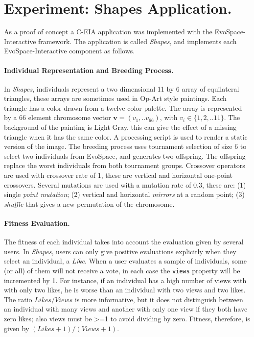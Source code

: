 \documentclass{llncs}
\begin{document}
\section{Experiment: Shapes Application.}
\label{sec:experiments}
As a proof of concept a C-EIA application was implemented with the EvoSpace-Interactive framework.
The application is called \emph{Shapes}, and implements each EvoSpace-Interactive component as follows.

\paragraph{Individual Representation and Breeding Process.}
In \emph{Shapes}, individuals represent a two dimensional 11 by 6 array of equilateral triangles, these arrays are sometimes used in Op-Art style paintings.
Each triangle has a color drawn from a twelve color palette.
The array is represented by a 66 element chromosome vector $\mathbf{v}=(v_1,..v_{66})$, with $v_i \in \{ 1,2,..11 \}$.
The background of the painting is Light Gray, this can give the effect of a missing triangle when it has the same color.
A processing script is used to render a static version of the image.
The breeding process uses tournament selection of size 6 to select two individuals from EvoSpace,
and generates two offspring.
The offspring replace the worst individuals from both tournament groups.
Crossover operators are used with crossover rate of 1, these are vertical and horizontal one-point crossovers.
Several mutations are used with a mutation rate of 0.3, these are:
(1) single \emph{point mutation}; (2) vertical and horizontal \emph{mirrors} at a random point;
(3) \emph{shuffle} that gives a new permutation of the chromosome.



\paragraph{Fitness Evaluation.}
The fitness of each individual takes into account the evaluation given by several users.
In \emph{Shapes}, users can only give positive evaluations explicitly when they select an individual, a \emph{Like}.
When a user evaluates a sample of individuals, some (or all) of them will not receive a vote, in each case the \texttt{views} property will be incremented by 1.
For instance, if an individual has a high number of views with with only two likes, he is worse than an individual with two views and two likes.
The ratio $Likes/Views$ is more informative, but it does not distinguish between an individual with many views and another with only
one view if they both have zero likes; also views must be >=1 to avoid dividing by zero.
Fitness, therefore, is given by $(Likes+1)/(Views+1)$.
\end{document}
